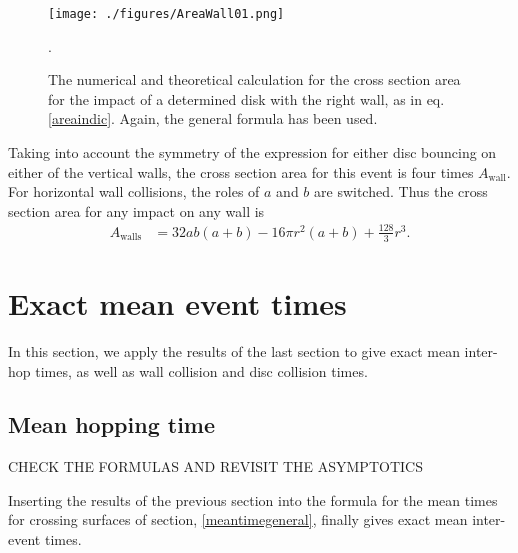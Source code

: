 \documentclass[superscriptaddress,pre,reprint,showpacs,onecolumn]{revtex4-1}
\begin{document}
\begin{figure}
\centering
\texttt{[image: ./figures/AreaWall01.png]}
\caption{The numerical and theoretical calculation for the cross section area
for the impact of a determined disk with the right wall, as in eq. \ref{areaindic}.
Again, the general formula has been used.}
\label{area1derecha}.
\end{figure}

Taking into account the symmetry of the expression for either disc
 bouncing on either of the vertical walls, the
cross section area for this event is four times $A_\textrm{wall}$. For horizontal wall 
collisions, the roles of $a$ and $b$ are switched.
Thus the cross section area for any impact on any wall is
\begin{align}\label{areawalls}
 A_\text{walls} & = 32 a b (a+b)-16 \pi r^2 (a+b) +\frac{128}{3}r^3.
\end{align}


\section{Exact mean event times}

In this section, we apply the results of the last section to give
exact mean inter-hop times, as well as wall collision and disc collision times.

\subsection{Mean hopping time}

 CHECK THE FORMULAS AND REVISIT THE ASYMPTOTICS 
 
Inserting the results of the previous section 
into the formula for the mean times for crossing
surfaces of section, \eqref{meantimegeneral}, finally gives exact mean inter-event times.
\end{document}
